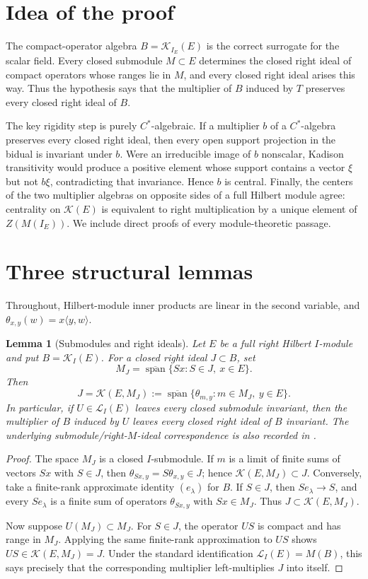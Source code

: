 \documentclass[11pt]{article}
\newtheorem{lemma}{Lemma}
\newcommand{\Icoeff}{I_E}
\newcommand{\Kcomp}{\mathcal K}
\newcommand{\Ladj}{\mathcal L}
\newcommand{\spn}{\operatorname{span}}
\begin{document}
\section{Idea of the proof}

The compact-operator algebra $B=\Kcomp_{\Icoeff}(E)$ is the correct surrogate
for the scalar field.  Every closed submodule $M\subset E$ determines the
closed right ideal of compact operators whose ranges lie in $M$, and every
closed right ideal arises this way.  Thus the hypothesis says that the
multiplier of $B$ induced by $T$ preserves every closed right ideal of $B$.

The key rigidity step is purely $C^*$-algebraic.  If a multiplier $b$ of a
$C^*$-algebra preserves every closed right ideal, then every open support
projection in the bidual is invariant under $b$.  Were an irreducible image of
$b$ nonscalar, Kadison transitivity would produce a positive element whose
support contains a vector $\xi$ but not $b\xi$, contradicting that invariance.
Hence $b$ is central.  Finally, the centers of the two multiplier algebras on
opposite sides of a full Hilbert module agree: centrality on $\Kcomp(E)$ is
equivalent to right multiplication by a unique element of
$Z(M(\Icoeff))$.  We include direct proofs of every module-theoretic passage.

\section{Three structural lemmas}

Throughout, Hilbert-module inner products are linear in the second variable,
and $\theta_{x,y}(w)=x\langle y,w\rangle$.

\begin{lemma}[Submodules and right ideals]\label{lem:correspondence}
Let $E$ be a full right Hilbert $I$-module and put $B=\Kcomp_I(E)$.  For a
closed right ideal $J\subset B$, set
\[
 M_J=\overline{\spn}\{Sx:S\in J,\ x\in E\}.
\]
Then
\[
 J=\Kcomp(E,M_J):=
 \overline{\spn}\{\theta_{m,y}:m\in M_J,\ y\in E\}.
\]
In particular, if $U\in\Ladj_I(E)$ leaves every closed submodule invariant,
then the multiplier of $B$ induced by $U$ leaves every closed right ideal of
$B$ invariant.  The underlying submodule/right-$M$-ideal correspondence is
also recorded in \cite[Theorem~6.6]{BEZ}.
\end{lemma}

\begin{proof}
The space $M_J$ is a closed $I$-submodule.  If $m$ is a limit of finite sums
of vectors $Sx$ with $S\in J$, then
$\theta_{Sx,y}=S\theta_{x,y}\in J$; hence
$\Kcomp(E,M_J)\subset J$.  Conversely, take a finite-rank approximate
identity $(e_\lambda)$ for $B$.  If $S\in J$, then
$Se_\lambda\to S$, and every $Se_\lambda$ is a finite sum of operators
$\theta_{Sx,y}$ with $Sx\in M_J$.  Thus $J\subset\Kcomp(E,M_J)$.

Now suppose $U(M_J)\subset M_J$.  For $S\in J$, the operator $US$ is compact
and has range in $M_J$.  Applying the same finite-rank approximation to $US$
shows $US\in\Kcomp(E,M_J)=J$.  Under the standard identification
$\Ladj_I(E)=M(B)$, this says precisely that the corresponding multiplier
left-multiplies $J$ into itself.
\end{proof}
\end{document}
